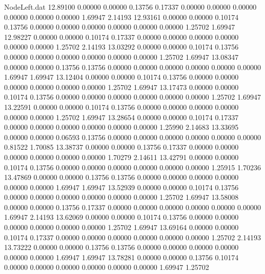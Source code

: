 \begin{filecontents}{NodeLeft.dat}
  12.89100    0.00000    0.00000     0.13756    0.17337    0.00000    0.00000    0.00000    0.00000    0.00000    0.00000    1.69947    2.14193
  12.93161    0.00000    0.00000     0.10174    0.13756    0.00000    0.00000    0.00000    0.00000    0.00000    0.00000    1.25702    1.69947
  12.98227    0.00000    0.00000     0.10174    0.17337    0.00000    0.00000    0.00000    0.00000    0.00000    0.00000    1.25702    2.14193
  13.03292    0.00000    0.00000     0.10174    0.13756    0.00000    0.00000    0.00000    0.00000    0.00000    0.00000    1.25702    1.69947
  13.08347    0.00000    0.00000     0.13756    0.13756    0.00000    0.00000    0.00000    0.00000    0.00000    0.00000    1.69947    1.69947
  13.12404    0.00000    0.00000     0.10174    0.13756    0.00000    0.00000    0.00000    0.00000    0.00000    0.00000    1.25702    1.69947
  13.17473    0.00000    0.00000     0.10174    0.13756    0.00000    0.00000    0.00000    0.00000    0.00000    0.00000    1.25702    1.69947
  13.22591    0.00000    0.00000     0.10174    0.13756    0.00000    0.00000    0.00000    0.00000    0.00000    0.00000    1.25702    1.69947
  13.28654    0.00000    0.00000     0.10174    0.17337    0.00000    0.00000    0.00000    0.00000    0.00000    0.00000    1.25990    2.14683
  13.33695    0.00000    0.00000     0.06593    0.13756    0.00000    0.00000    0.00000    0.00000    0.00000    0.00000    0.81522    1.70085
  13.38737    0.00000    0.00000     0.13756    0.17337    0.00000    0.00000    0.00000    0.00000    0.00000    0.00000    1.70279    2.14611
  13.42791    0.00000    0.00000     0.10174    0.13756    0.00000    0.00000    0.00000    0.00000    0.00000    0.00000    1.25915    1.70236
  13.47869    0.00000    0.00000     0.13756    0.13756    0.00000    0.00000    0.00000    0.00000    0.00000    0.00000    1.69947    1.69947
  13.52939    0.00000    0.00000     0.10174    0.13756    0.00000    0.00000    0.00000    0.00000    0.00000    0.00000    1.25702    1.69947
  13.58008    0.00000    0.00000     0.13756    0.17337    0.00000    0.00000    0.00000    0.00000    0.00000    0.00000    1.69947    2.14193
  13.62069    0.00000    0.00000     0.10174    0.13756    0.00000    0.00000    0.00000    0.00000    0.00000    0.00000    1.25702    1.69947
  13.69164    0.00000    0.00000     0.10174    0.17337    0.00000    0.00000    0.00000    0.00000    0.00000    0.00000    1.25702    2.14193
  13.73222    0.00000    0.00000     0.13756    0.13756    0.00000    0.00000    0.00000    0.00000    0.00000    0.00000    1.69947    1.69947
  13.78281    0.00000    0.00000     0.13756    0.10174    0.00000    0.00000    0.00000    0.00000    0.00000    0.00000    1.69947    1.25702

\end{filecontents}
